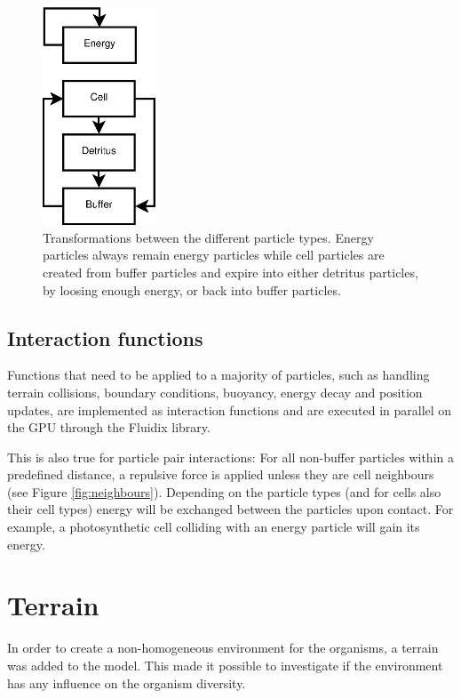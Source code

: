 \begin{figure}
  \centering
  \includegraphics[width=0.3\textwidth]{"figure/particle cycle"}
  \caption{Transformations between the different particle types. Energy particles always remain energy particles while cell particles are created from buffer particles and expire into either detritus particles, by loosing enough energy, or back into buffer particles.} \label{fig:particleCycle} 
\end{figure}

\subsection{Interaction functions}
Functions that need to be applied to a majority of particles, such as handling terrain collisions, boundary conditions, buoyancy, energy decay and position updates, are implemented as interaction functions and are executed in parallel on the GPU through the Fluidix library.

This is also true for particle pair interactions: For all non-buffer particles within a predefined distance, a repulsive force is applied unless they are cell neighbours (see Figure \ref{fig:neighbours}). Depending on the particle types (and for cells also their cell types) energy will be exchanged between the particles upon contact. For example, a photosynthetic cell colliding with an energy particle will gain its energy.

\section{Terrain}
In order to create a non-homogeneous environment for the organisms, a terrain was added to the model. This made it possible to investigate if the environment has any influence on the organism diversity.


